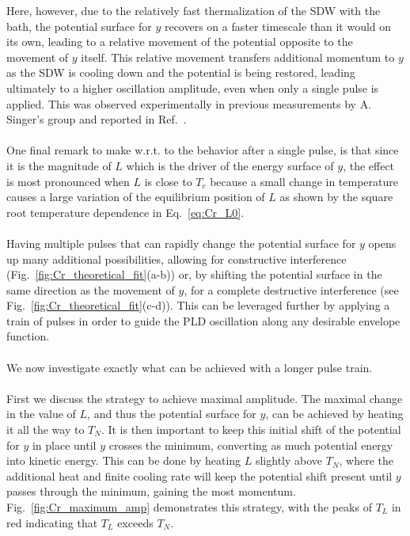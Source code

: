 Here, however, due to the relatively fast thermalization of the SDW with the bath, the potential surface for $y$ recovers on a faster timescale than it would on its own, leading to a relative movement of the potential opposite to the movement of $y$ itself.
This relative movement transfers additional momentum to $y$ as the SDW is cooling down and the potential is being restored, leading ultimately to a higher oscillation amplitude, even when only a single pulse is applied.
This was observed experimentally in previous measurements by A. Singer's group and reported in Ref.~\cite{Singer2015prl}. 
\\\\
One final remark to make w.r.t. to the behavior after a single pulse, is that since it is the magnitude of $L$ which is the driver of the energy surface of $y$, the effect is most pronounced when $L$ is close to $T_c$ because a small change in temperature causes a large variation of the equilibrium position of $L$ as shown by the square root temperature dependence in Eq.~\eqref{eq:Cr_L0}.    
\\\\
Having multiple pulses that can rapidly change the potential surface for $y$ opens up many additional possibilities, allowing for constructive interference (Fig.~\ref{fig:Cr_theoretical_fit}(a-b)) or, by shifting the potential surface in the same direction as the movement of $y$, for a complete destructive interference (see Fig.~\ref{fig:Cr_theoretical_fit}(c-d)).
This can be leveraged further by applying a train of pulses in order to guide the PLD oscillation along any desirable envelope function.
\\\\
We now investigate exactly what can be achieved with a longer pulse train.
\\\\
First we discuss the strategy to achieve maximal amplitude.
The maximal change in the value of $L$, and thus the potential surface for $y$, can be achieved by heating it all the way to $T_N$.
It is then important to keep this initial shift of the potential for $y$ in place until $y$ crosses the minimum, converting as much potential energy into kinetic energy.
This can be done by heating $L$ slightly above $T_N$, where the additional heat and finite cooling rate will keep the potential shift present until $y$ passes through the minimum, gaining the most momentum.
Fig.~\ref{fig:Cr_maximum_amp} demonstrates this strategy, with the peaks of $T_L$ in red indicating that $T_L$ exceeds $T_N$.
